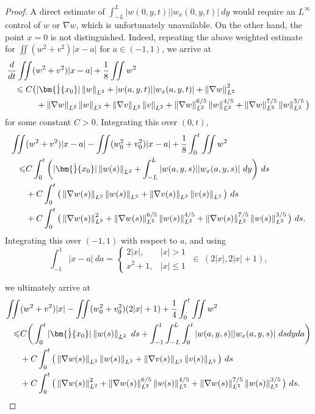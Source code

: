 \documentclass[final,11pt]{article}
\renewcommand{\leq}{\leqslant}
\theoremstyle{definition} %
\newcommand{\lv}{\left\Vert}
\newcommand{\rv}{\right\Vert}
\theoremstyle{plain}
\theoremstyle{definition} %
\theoremstyle{remark}
\begin{document}
\begin{proof}
A direct estimate of  $\displaystyle \int_{-L}^L|w(0,y,t)||w_x(0,y,t)|~dy$ would require an $L^\infty$ control of $w$ or $\nabla w$, which is unfortunately unavailable. On the other hand, the point $x=0$ is not distinguished. Indeed, repeating the above weighted estimate for $\iint (w^2 + v^2)|x-a| $ for $a \in (-1,1)$, we arrive at
\begin{equation*}\label{e:avg1}
\begin{split}
\frac{d}{dt}&\iint (w^2 + v^2)|x-a| + \frac{1}{8}\iint w^2 \\
&\begin{aligned}\leq C\big(& |\bm{\dot}{x_0}|\lv w\rv_{L^2} + |w(a,y,t)||w_x(a,y,t)| + \lv \nabla w \rv_{L^2}^2 \\
&+ \lv \nabla w \rv_{L^2}\lv w \rv_{L^2} + \lv \nabla v \rv_{L^2} \lv v\rv_{L^2}+  \Vert \nabla  w \Vert_{L^2}^{6/5}\lv w\rv_{L^2}^{4/5} +  \Vert \nabla  w \Vert_{L^2}^{7/5}\lv w\rv_{L^2}^{3/5} \big)\end{aligned} 
\end{split}
\end{equation*}
for some constant $C>0$. Integrating this over $(0,t)$,
\begin{align*}
\iint & (w^2 + v^2)|x-a|-\iint (w_0^2 + v_0^2)|x-a| + \frac{1}{8}\int_0^t\iint w^2 \\
\leq & C\int_0^t \bigg(|\bm{\dot}{x_0}|\lv w(s)\rv_{L^2}+\int_{-L}^L|w(a,y,s)||w_x(a,y,s)|~dy \bigg)~ds \\
&+C\int_0^t\big(\lv \nabla w(s) \rv_{L^2}\lv w(s) \rv_{L^2}
+  \lv \nabla v(s) \rv_{L^2} \lv v(s)\rv_{L^2} \big)~ds\\
&+ C\int_0^t \big( \lv \nabla w(s) \rv_{L^2}^2  + \Vert \nabla  w(s) \Vert_{L^2}^{6/5}\lv w(s)\rv_{L^2}^{4/5} +  \Vert \nabla  w (s)\Vert_{L^2}^{7/5}\lv w(s)\rv_{L^2}^{3/5}\big)~ds . 
\end{align*}
Integrating this over $(-1,1)$ with respect to $a$, and using 
\[
\int_{-1}^1|x-a|~da = \begin{cases} 2|x|, &|x| > 1 \\x^2 + 1, &|x| \leq 1\end{cases}\  \in \ (2|x|, 2|x|+1),
\]

we ultimately arrive at
\begin{align*}
\iint &(w^2 + v^2)|x|-\iint (w_0^2 + v_0^2)(2|x|+1) + \frac{1}{4}\int_0^t\iint w^2 \\
\leq &C\bigg(\int_0^t |\bm{\dot}{x_0}|\lv w(s)\rv_{L^2}~ds+\int_{-1}^1\int_{-L}^L\int_0^t  |w(a,y,s)||w_x(a,y,s)|~dsdyda\bigg)\\
&+C\int_0^t\big(\lv \nabla w(s) \rv_{L^2}\lv w(s) \rv_{L^2} 
 +  \lv \nabla v(s) \rv_{L^2} \lv v(s)\rv_{L^2}\big)~ds\\
&+ C\int_0^t \big( \lv \nabla w(s) \rv_{L^2}^2  + \Vert \nabla  w(s) \Vert_{L^2}^{6/5}\lv w(s)\rv_{L^2}^{4/5} +  \Vert \nabla  w (s)\Vert_{L^2}^{7/5}\lv w(s)\rv_{L^2}^{3/5}\big)~ds . 
\end{align*}


\end{proof}
\end{document}
